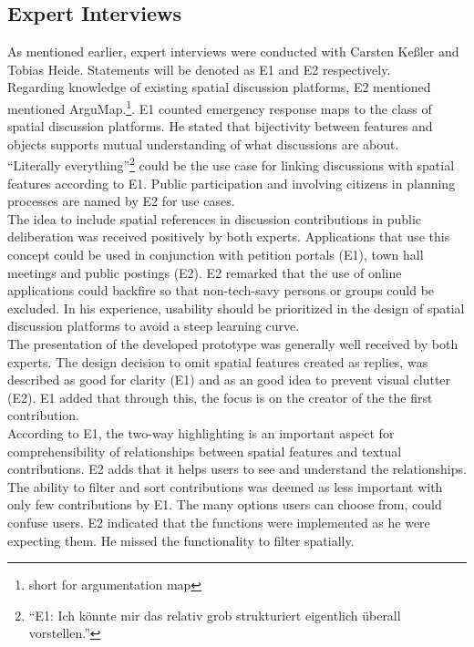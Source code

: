 \subsection{Expert Interviews}
\label{sub:ev_expert_interviews}
As mentioned earlier, expert interviews were conducted with Carsten Ke{\ss}ler and Tobias Heide. Statements will be denoted as E1 and E2 respectively.\\
Regarding knowledge of existing spatial discussion platforms, E2 mentioned mentioned ArguMap.\footnote{short for argumentation map}. E1 counted emergency response maps to the class of spatial discussion platforms. He stated that bijectivity between features and objects supports mutual understanding of what discussions are about.\\
``Literally everything''\footnote{``E1: Ich k{\"o}nnte mir das relativ grob strukturiert eigentlich {\"u}berall vorstellen.''} could be the use case for linking discussions with spatial features according to E1. Public participation and involving citizens in planning processes are named by E2 for use cases.\\
The idea to include spatial references in discussion contributions in public deliberation was received positively by both experts. Applications that use this concept could be used in conjunction with petition portals (E1), town hall meetings and public postings (E2). E2 remarked that the use of online applications could backfire so that non-tech-savy persons or groups could be excluded. In his experience, usability should be prioritized in the design of spatial discussion platforms to avoid a steep learning curve.\\
The presentation of the developed prototype was generally well received by both experts. The design decision to omit spatial features created as replies, was described as good for clarity (E1) and as an good idea to prevent visual clutter (E2). E1 added that through this, the focus is on the creator of the the first contribution.\\
According to E1, the two-way highlighting is an important aspect for comprehensibility of relationships between spatial features and textual contributions. E2 adds that it helps users to see and understand the relationships.\\
The ability to filter and sort contributions was deemed as less important with only few contributions by E1. The many options users can choose from, could confuse users. E2 indicated that the functions were implemented as he were expecting them. He missed the functionality to filter spatially.\\
